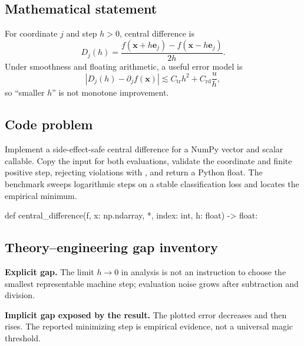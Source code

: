 
        \subsection{Mathematical statement}


For coordinate $j$ and step $h>0$, central difference is
\[
  D_j(h)=\frac{f(\bm x+h\bm e_j)-f(\bm x-h\bm e_j)}{2h}.
\]
Under smoothness and floating arithmetic, a useful error model is
\[
  |D_j(h)-\partial_jf(\bm x)|
  \lesssim C_{\mathrm{tr}}h^2+C_{\mathrm{rd}}\frac{u}{h},
\]
so ``smaller $h$'' is not monotone improvement.


        \subsection{Code problem}


Implement a side-effect-safe central difference for a NumPy vector and scalar
callable.  Copy the input for both evaluations, validate the coordinate and
finite positive step, rejecting violations with , and return a
Python float.  The benchmark sweeps logarithmic
steps on a stable classification loss and locates the empirical minimum.


        \begin{contractbox}
        \begin{Code}
        def central_difference(f, x: np.ndarray, *, index: int, h: float) -> float:
        \end{Code}
        \end{contractbox}

        \subsection{Theory--engineering gap inventory}

        \begin{gapbox}
        \textbf{Explicit gap.} The limit $h\to0$ in analysis is not an instruction to choose the smallest representable machine step; evaluation noise grows after subtraction and division.

        \textbf{Implicit gap exposed by the result.} The plotted error decreases and then rises.  The reported minimizing step is empirical evidence, not a universal magic threshold.
        \end{gapbox}

